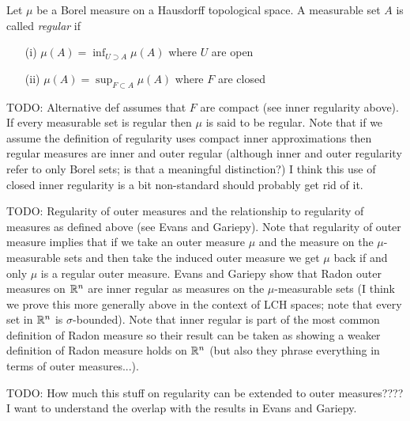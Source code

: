\begin{defn}Let $\mu$ be a Borel measure on a Hausdorff topological space. A measurable set $A$ is called \emph{regular} if 
\begin{itemize}
\item[(i)]$\mu(A) = \inf_{U \supset A} \mu(A)$ where $U$ are open
\item[(ii)]$\mu(A) = \sup_{F \subset A} \mu(A)$ where $F$ are closed 
\end{itemize}
TODO: Alternative def assumes that $F$ are compact (see inner
regularity above).  If every measurable set is regular then $\mu$ is
said to be regular.  Note that if we assume the definition of
regularity uses compact inner approximations then regular measures are
inner and outer regular (although inner and outer regularity refer to
only Borel sets; is that a meaningful distinction?)  I think this use
of closed inner regularity is a bit non-standard should probably get
rid of it.
\end{defn}


TODO: Regularity of outer measures and the relationship to regularity
of measures as defined above (see Evans and Gariepy).  Note that
regularity of outer measure implies that if we take an outer measure $\mu$
and the measure on the $\mu$-measurable sets and then take the induced
outer measure we get $\mu$ back if and only $\mu$ is a regular outer
measure.  Evans and Gariepy show that Radon outer measures on
$\mathbb{R}^n$ are inner
regular as measures on the $\mu$-measurable sets (I think we prove this more
generally above in the context of LCH spaces; note that every set in
$\mathbb{R}^n$ is $\sigma$-bounded).  Note that inner
regular is part of the most common definition of Radon measure so
their result can be taken as showing a weaker definition of Radon
measure holds on $\mathbb{R}^n$ (but also they phrase everything in terms
of outer measures...).

TODO: How much this stuff on regularity can be extended to outer
measures????  I want to understand the overlap with the results in
Evans and Gariepy.

